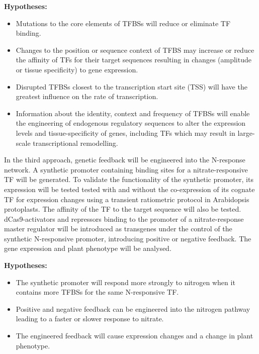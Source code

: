 \documentclass[../main.tex]{subfiles}
\begin{document}
\textbf{Hypotheses:}

\begin{itemize}\tightlist
	\item Mutations to the core elements of TFBSs will reduce or eliminate TF binding.
	\item Changes to the position or sequence context of TFBS may increase or reduce the affinity of TFs for their target sequences resulting in changes (amplitude or tissue specificity) to gene expression.
	\item Disrupted TFBSs closest to the transcription start site (TSS) will have the greatest influence on the rate of transcription.
	\item Information about the identity, context and frequency of TFBSs will enable the engineering of endogenous regulatory sequences to alter the expression levels and tissue\hyp{}specificity of genes, including TFs which may result in large\hyp{}scale transcriptional remodelling.
\end{itemize}

In the third approach, genetic feedback will be engineered into the
N\hyp{}response network.
A synthetic promoter containing binding sites for a nitrate\hyp{}responsive TF will be generated.
To validate the functionality of the synthetic promoter, its expression will be tested tested with and without the co\hyp{}expression of its cognate TF for expression changes using a transient ratiometric protocol in Arabidopsis protoplasts.
The affinity of the TF to the target sequence will also be tested.
dCas9\hyp{}activators and repressors binding to the promoter of a nitrate\hyp{}response master regulator will be introduced as transgenes under the control of the synthetic N\hyp{}responsive promoter, introducing positive or negative feedback.
The gene expression and plant phenotype will be analysed.

\textbf{Hypotheses:}

\begin{itemize}\tightlist
	\item The synthetic promoter will respond more strongly to nitrogen when it contains more TFBSs for the same N\hyp{}responsive TF.
	\item Positive and negative feedback can be engineered into the nitrogen pathway leading to a faster or slower response to nitrate.
	\item The engineered feedback will cause expression changes and a change in plant phenotype.
\end{itemize}
\end{document}
